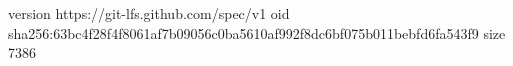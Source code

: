 version https://git-lfs.github.com/spec/v1
oid sha256:63bc4f28f4f8061af7b09056c0ba5610af992f8dc6bf075b011bebfd6fa543f9
size 7386
